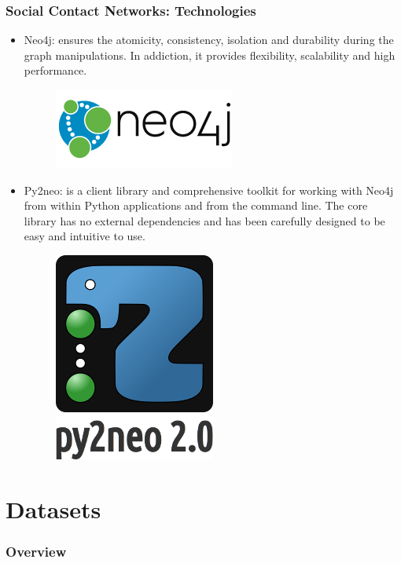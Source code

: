 \documentclass{beamer}
\begin{document}

\begin{frame}
\frametitle{Social Contact Networks: Technologies}
\begin{itemize}
\item Neo4j: ensures the atomicity, consistency, isolation and durability during the graph manipulations. In addiction, it provides flexibility, scalability and high performance.
\begin{figure}[H]
\raggedright
\includegraphics[scale=0.25]{img/neo4j-logo-2015.png}
\end{figure} 
\item Py2neo: is a client library and comprehensive toolkit for working with Neo4j from within Python applications and from the command line. The core library has no external dependencies and has been carefully designed to be easy and intuitive to use.
\begin{figure}[H]
\raggedright
\includegraphics[scale=0.2]{img/py2neo.png}
\end{figure} 
\end{itemize} 

\end{frame}


\section{Datasets}

\begin{frame}
\frametitle{Overview} %
\tableofcontents[currentsection] %
\end{frame}
\end{document}
